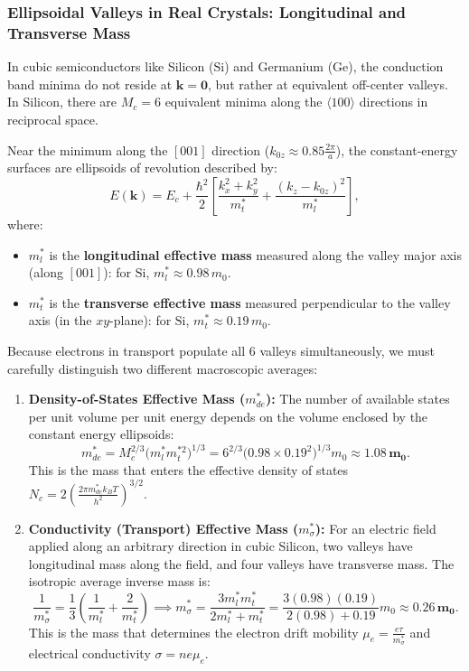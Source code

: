 \documentclass[11pt,a4paper]{article}
\newcommand{\vb}[1]{\mathbf{#1}}
\newcommand{\hb}{\hbar}
\newcommand{\hbarsq}{\hb^2}
\newcommand{\kk}{\mathbf{k}}
\begin{document}
\subsubsection{Ellipsoidal Valleys in Real Crystals: Longitudinal and Transverse Mass}
In cubic semiconductors like Silicon ($\text{Si}$) and Germanium ($\text{Ge}$), the conduction band minima do not reside at $\kk = \vb{0}$, but rather at equivalent off-center valleys. In Silicon, there are $M_c = 6$ equivalent minima along the $\langle 100 \rangle$ directions in reciprocal space. 

Near the minimum along the $[001]$ direction ($k_{0z} \approx 0.85\frac{2\pi}{a}$), the constant-energy surfaces are ellipsoids of revolution described by:
\begin{equation}
    E(\kk) = E_c + \frac{\hbarsq}{2}\left[\frac{k_x^2 + k_y^2}{m_t^*} + \frac{(k_z - k_{0z})^2}{m_l^*}\right],
    \label{eq:ellipsoidal_valleys}
\end{equation}
where:
\begin{itemize}[noitemsep]
    \item $m_l^*$ is the \textbf{longitudinal effective mass} measured along the valley major axis (along $[001]$): for $\text{Si}$, $m_l^* \approx 0.98\,m_0$.
    \item $m_t^*$ is the \textbf{transverse effective mass} measured perpendicular to the valley axis (in the $xy$-plane): for $\text{Si}$, $m_t^* \approx 0.19\,m_0$.
\end{itemize}

Because electrons in transport populate all $6$ valleys simultaneously, we must carefully distinguish two different macroscopic averages:
\begin{enumerate}
    \item \textbf{Density-of-States Effective Mass ($m_{de}^*$):} The number of available states per unit volume per unit energy depends on the volume enclosed by the constant energy ellipsoids:
    \begin{equation}
        m_{de}^* = M_c^{2/3}\big(m_l^* m_t^{*2}\big)^{1/3} = 6^{2/3}\big(0.98 \times 0.19^2\big)^{1/3}m_0 \approx \mathbf{1.08\,m_0}.
    \end{equation}
    This is the mass that enters the effective density of states $N_c = 2\left(\frac{2\pi m_{de}^* k_B T}{h^2}\right)^{3/2}$.
    \item \textbf{Conductivity (Transport) Effective Mass ($m_{\sigma}^*$):} For an electric field applied along an arbitrary direction in cubic Silicon, two valleys have longitudinal mass along the field, and four valleys have transverse mass. The isotropic average inverse mass is:
    \begin{equation}
        \frac{1}{m_{\sigma}^*} = \frac{1}{3}\left(\frac{1}{m_l^*} + \frac{2}{m_t^*}\right) \implies m_{\sigma}^* = \frac{3 m_l^* m_t^*}{2m_l^* + m_t^*} = \frac{3(0.98)(0.19)}{2(0.98) + 0.19}m_0 \approx \mathbf{0.26\,m_0}.
    \end{equation}
    This is the mass that determines the electron drift mobility $\mu_e = \frac{e\tau}{m_{\sigma}^*}$ and electrical conductivity $\sigma = n e \mu_e$.
\end{enumerate}
\end{document}
